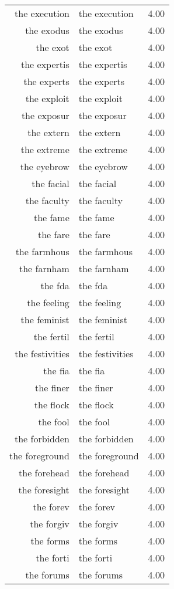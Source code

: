 \begin{table}[ht]
\begin{tabular}{rlr}
  the execution & the execution & 4.00 \\ 
  the exodus & the exodus & 4.00 \\ 
  the exot & the exot & 4.00 \\ 
  the expertis & the expertis & 4.00 \\ 
  the experts & the experts & 4.00 \\ 
  the exploit & the exploit & 4.00 \\ 
  the exposur & the exposur & 4.00 \\ 
  the extern & the extern & 4.00 \\ 
  the extreme & the extreme & 4.00 \\ 
  the eyebrow & the eyebrow & 4.00 \\ 
  the facial & the facial & 4.00 \\ 
  the faculty & the faculty & 4.00 \\ 
  the fame & the fame & 4.00 \\ 
  the fare & the fare & 4.00 \\ 
  the farmhous & the farmhous & 4.00 \\ 
  the farnham & the farnham & 4.00 \\ 
  the fda & the fda & 4.00 \\ 
  the feeling & the feeling & 4.00 \\ 
  the feminist & the feminist & 4.00 \\ 
  the fertil & the fertil & 4.00 \\ 
  the festivities & the festivities & 4.00 \\ 
  the fia & the fia & 4.00 \\ 
  the finer & the finer & 4.00 \\ 
  the flock & the flock & 4.00 \\ 
  the fool & the fool & 4.00 \\ 
  the forbidden & the forbidden & 4.00 \\ 
  the foreground & the foreground & 4.00 \\ 
  the forehead & the forehead & 4.00 \\ 
  the foresight & the foresight & 4.00 \\ 
  the forev & the forev & 4.00 \\ 
  the forgiv & the forgiv & 4.00 \\ 
  the forms & the forms & 4.00 \\ 
  the forti & the forti & 4.00 \\ 
  the forums & the forums & 4.00 \\ 

\end{tabular}
\end{table}
